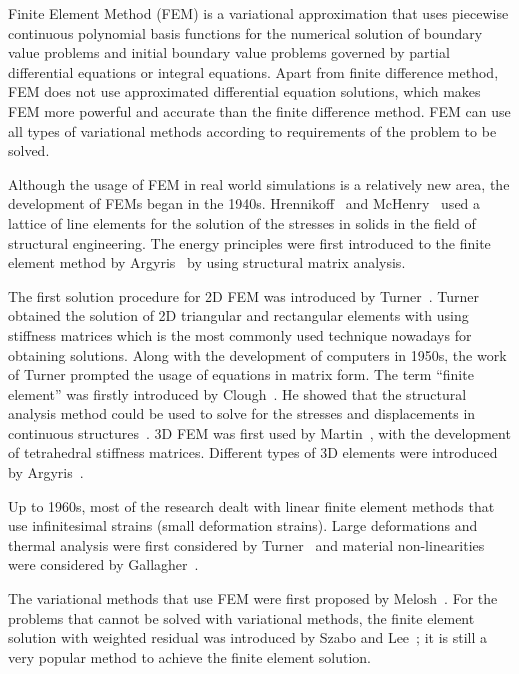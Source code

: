 Finite Element Method (FEM) is a variational approximation that uses piecewise continuous polynomial basis functions for the numerical solution of boundary value problems and initial boundary value problems governed by partial differential equations or integral equations. Apart from finite difference method, FEM does not use approximated differential equation solutions, which makes FEM more powerful and accurate than the finite difference method. FEM can use all types of variational methods according to requirements of the problem to be solved.

Although the usage of FEM in real world simulations is a relatively new area, the development of  FEMs began in the 1940s. Hrennikoff~\cite{Hrennikoff41} and McHenry~\cite{McHenry43} used a lattice of line elements for the solution of the stresses in solids in the field of structural engineering. The energy principles were first introduced to the finite element method by Argyris~\cite{Argyris54} by using structural matrix analysis.

The first solution procedure for 2D FEM was introduced by Turner~\cite{Turner56}. Turner obtained the solution of 2D triangular and rectangular elements with using stiffness matrices which is the most commonly used technique nowadays for obtaining solutions. Along with the development of computers in 1950s, the work of Turner prompted the usage of equations in matrix form. The term ``finite element'' was firstly introduced by Clough~\cite{Clough60}. He showed that the structural analysis method could be used to solve for the stresses and displacements in continuous structures~\cite{Clough99}. 3D FEM was first used by Martin~\cite{Martin61}, with the development of tetrahedral stiffness matrices. Different types of 3D elements were introduced by Argyris~\cite{Argyris64}.

Up to 1960s, most of the research dealt with linear finite element methods that use infinitesimal strains (small deformation strains). Large deformations and thermal analysis were first considered by Turner~\cite{Turner60} and material non-linearities were considered by Gallagher~\cite{Gallagher62}.

The variational methods that use FEM were first proposed by Melosh~\cite{Melosh63}. For the problems that cannot be solved with variational methods, the finite element solution with weighted residual was introduced by Szabo and Lee~\cite{Szabo69}; it is still a very popular method to achieve the finite element solution.

